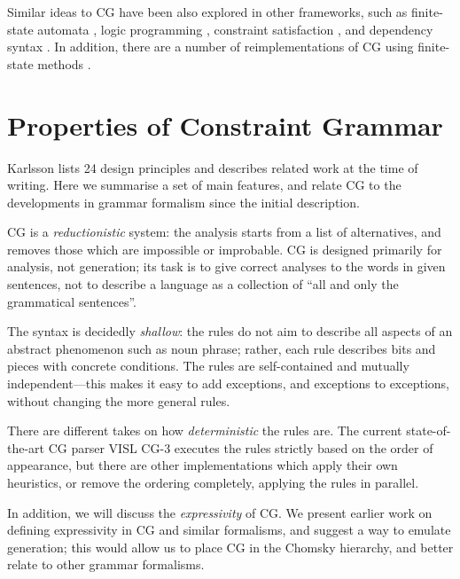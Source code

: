Similar ideas to CG have been also explored in other frameworks, such as finite-state automata \cite{gross1997local,grana2003fst},
logic programming \cite{oflazer97votingconstraints,lager98}, 
constraint satisfaction \cite{padro1996csp}, 
and dependency syntax \cite{tapanainen97fdg}. 
 In addition, there are a number of reimplementations of CG using finite-state methods \cite{yli-jyra2011cg_engine,hulden2011cg_engine,peltonen2011}. 




\section{Properties of Constraint Grammar}\label{sec:properties}

Karlsson \cite{karlsson1995constraint} lists 24 design principles and describes
related work at the time of writing.
Here we summarise a set of main features, and relate CG to the developments in grammar formalism since the initial description.

CG is a \emph{reductionistic} system: the analysis starts from a list of alternatives,
and removes those which are impossible or improbable.
CG is designed primarily for analysis, not generation; its task is 
to give correct analyses to the words in given sentences,
not to describe a language as a collection of ``all and only the grammatical sentences''.

The syntax is decidedly \emph{shallow}: the rules do not aim to
describe all aspects of an abstract phenomenon such as noun phrase; 
rather, each rule describes bits and pieces with concrete conditions.
The rules are self-contained and mutually independent---this makes it 
easy to add exceptions, and exceptions to exceptions, without 
changing the more general rules.

There are different takes on how \emph{deterministic} the rules are.
The current state-of-the-art CG parser VISL CG-3 executes the rules strictly 
based on the order of appearance, but there are other implementations which 
apply their own heuristics, or remove the ordering completely, 
applying the rules in parallel. %

In addition, we will discuss the \emph{expressivity} of CG. 
We present earlier work on defining expressivity in CG and similar formalisms,
and suggest a way to emulate generation; this would allow us to place CG in the Chomsky hierarchy, and better relate to other grammar formalisms.

